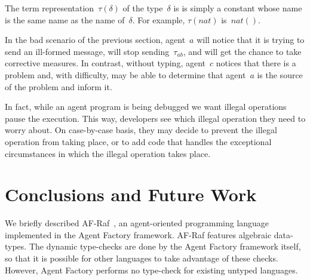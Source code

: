 \documentclass[preprint]{sigplanconf} %
\theoremstyle{remark}
\begin{document}
The term representation~$\tau(\delta)$ of the type~$\delta$ is is simply a
constant whose name is the same name as the name of~$\delta$. For example,
$\tau(\mathit{nat})$ is~$\mathit{nat}()$.

In the bad scenario of the previous section, agent~$a$ will notice that it
is trying to send an ill-formed message, will stop sending~$\tau_{ab}$, and
will get the chance to take corrective measures. In contrast, without
typing, agent~$c$ notices that there is a problem and, with difficulty, may
be able to determine that agent~$a$ is the source of the problem and inform
it.

In fact, while an agent program is being debugged we want illegal
operations pause the execution. This way, developers see which illegal
operation they need to worry about. On case-by-case basis, they may decide
to prevent the illegal operation from taking place, or to add code that
handles the exceptional circumstances in which the illegal operation takes
place.

%
%
\section{Conclusions and Future Work} \label{sec:conclusions} %

We briefly described AF-Raf~\cite{site:af-raf}, an agent-oriented
programming language implemented in the Agent Factory framework. AF-Raf
features algebraic data-types. The dynamic type-checks are done by the
Agent Factory framework itself, so that it is possible for other languages
to take advantage of these checks. However, Agent Factory performs no
type-check for existing untyped languages.
\end{document}
